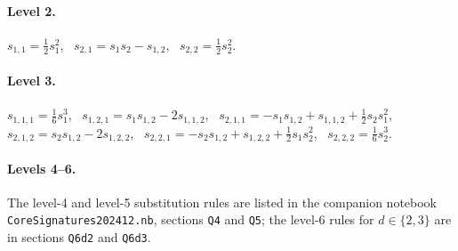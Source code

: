\documentclass[11pt,english]{article}
\newcommand{\nbfile}[1]{\nolinkurl{#1}}
\begin{document}
\paragraph{Level 2.}
$s_{1,1}=\tfrac{1}{2}s_{1}^{2}$, \ $s_{2,1}=s_{1}s_{2}-s_{1,2}$,
\ $s_{2,2}=\tfrac{1}{2}s_{2}^{2}$.

\paragraph{Level 3.}
$s_{1,1,1}=\tfrac{1}{6}s_{1}^{3}$, \ $s_{1,2,1}=s_{1}s_{1,2}-2s_{1,1,2}$,
\ $s_{2,1,1}=-s_{1}s_{1,2}+s_{1,1,2}+\tfrac{1}{2}s_{2}s_{1}^{2}$,
\ $s_{2,1,2}=s_{2}s_{1,2}-2s_{1,2,2}$, \ $s_{2,2,1}=-s_{2}s_{1,2}+s_{1,2,2}+\tfrac{1}{2}s_{1}s_{2}^{2}$,
\ $s_{2,2,2}=\tfrac{1}{6}s_{2}^{3}$.

\paragraph{Levels 4--6.}
The level-4 and level-5 substitution rules are listed in the companion
notebook \nbfile{CoreSignatures202412.nb}, sections \texttt{Q4} and
\texttt{Q5}; the level-6 rules for $d\in\{2,3\}$ are in sections
\texttt{Q6d2} and \texttt{Q6d3}.
\end{document}
